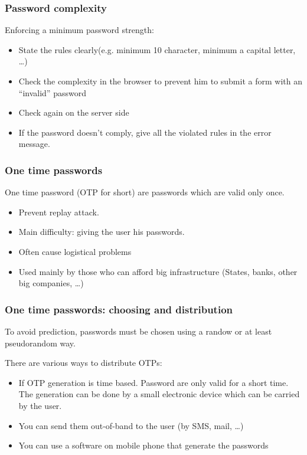 \begin{frame}
\frametitle{Password complexity}

Enforcing a minimum password strength:
\begin{itemize}
\item State the rules clearly(e.g. minimum 10 character, minimum a
  capital letter, \ldots)
\item Check the complexity in the browser to prevent him to submit a
  form with an ``invalid'' password
\item Check again on the server side
\item If the password doesn't comply, give all the violated rules in
  the error message.
\end{itemize}


\end{frame}



\begin{frame}
\frametitle{One time passwords}

One time password (OTP for short) are passwords which are valid only
once. 
\begin{itemize}
\item Prevent replay attack.
\item Main difficulty: giving the user his passwords. 
\item Often cause logistical problems 
\item Used mainly by those who can afford big infrastructure (States,
  banks, other big companies, \ldots)
\end{itemize}
\end{frame}


\begin{frame}
\frametitle{One time passwords: choosing and distribution}

To avoid prediction, passwords must be chosen using a randow or at
least pseudorandom way.

There are various ways to distribute OTPs:
\begin{itemize}
\item If OTP generation is time based. Password are only valid for a
  short time. The generation can be done by a small electronic
  device which can be carried by the user.
\item You can send them out-of-band to the user (by SMS, mail, \ldots)
\item You can use a software on mobile phone that generate the passwords
\end{itemize}
\end{frame}

